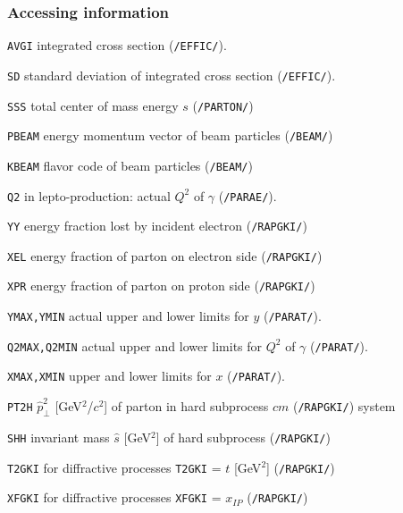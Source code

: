 \documentclass[10pt]{article} \usepackage{dina4}
\newcommand{\PO}{\ensuremath{ I\! \! P} }
\newcommand{\deflab}[1]{#1\hfil}%
\newenvironment{defl}[1]%
  {\begin{list}{}{\settowidth{\labelwidth}{#1}%
  \setlength{\leftmargin}{\labelwidth}%
  \addtolength{\leftmargin}{\labelsep}%
  \setlength{\itemsep}{0pt plus 1pt}
  \setlength{\parsep}{0pt plus 1pt}
  \setlength{\topsep}{0pt plus 1pt}
  \setlength{\partopsep}{0pt plus 1pt}
  \setlength{\parskip}{2mm plus 1mm minus 1mm}
  \let\makelabel\deflab}}%
  {\end{list}}
\begin{document}
\subsubsection{Accessing information}
\begin{defl}{123456789012345}
\item[ ]

\item[{\tt AVGI}] integrated cross section (\verb+/EFFIC/+).
\item[{\tt SD}] standard deviation of integrated cross section
                 (\verb+/EFFIC/+).

\item[ ]
\item[{\tt SSS}] 
total center of mass energy  $s$ (\verb+/PARTON/+)

\item[{\tt PBEAM}] energy momentum vector of beam particles
  (\verb+/BEAM/+)
\item[{\tt KBEAM}] flavor code of beam particles
 (\verb+/BEAM/+)


\item[{\tt Q2}] in lepto-production: actual $Q^2$ of
                         $\gamma$ (\verb+/PARAE/+).
\item[{\tt YY}]
                        energy fraction lost by incident electron
				(\verb+/RAPGKI/+)
\item[{\tt XEL}]
                        energy fraction of parton on electron side
				(\verb+/RAPGKI/+)
\item[{\tt XPR}]
                        energy fraction of parton on proton side
				(\verb+/RAPGKI/+)
\item[{\tt YMAX,YMIN}] actual upper and lower limits for $y$ 
                          (\verb+/PARAT/+).
\item[{\tt Q2MAX,Q2MIN}] actual upper and
                        lower limits for $Q^2$ of $\gamma$ (\verb+/PARAT/+).
\item[{\tt XMAX,XMIN}] 
upper and lower limits for $x$ (\verb+/PARAT/+).


\item[{\tt PT2H}]
                        $\hat{p}_{\perp} ^2$
     [GeV$^2$/$c^2$]
                      of parton in hard subprocess $cm$
			     (\verb+/RAPGKI/+)
system
\item[{\tt SHH}]
                        invariant mass $\hat{s}$ [GeV$^2$]
                     of hard subprocess (\verb+/RAPGKI/+)
\item[{\tt T2GKI}]
                        for diffractive processes 
                        \verb+T2GKI+ = $t$ [GeV$^2$] (\verb+/RAPGKI/+)
\item[{\tt XFGKI}]
                        for diffractive processes 
                        \verb+XFGKI+ = $x_{\PO}$ (\verb+/RAPGKI/+)
                                                


\end{defl}
\end{document}
